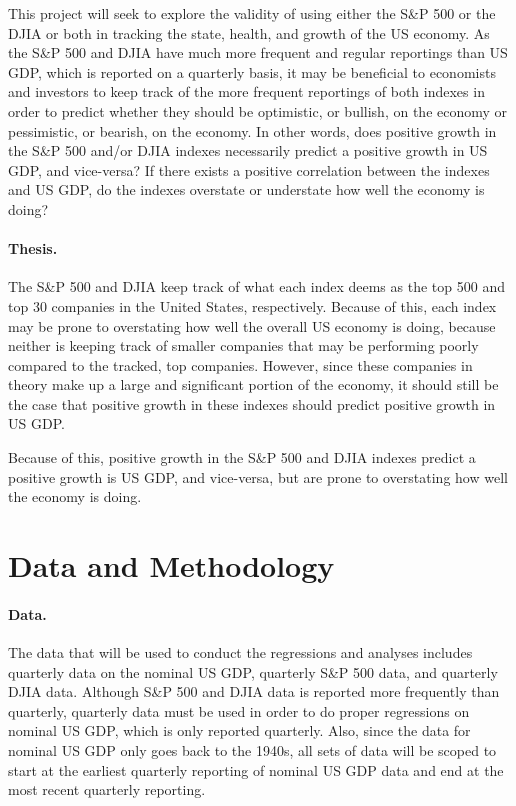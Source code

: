 \documentclass[11pt]{article}
\numberwithin{equation}{section}
\begin{document}
This project will seek to explore the validity of using either the S\&P 500 or the DJIA or both in tracking the state, health, and growth of the US economy. As the S\&P 500 and DJIA have much more frequent and regular reportings than US GDP, which is reported on a quarterly basis, it may be beneficial to economists and investors to keep track of the more frequent reportings of both indexes in order to predict whether they should be optimistic, or bullish, on the economy or pessimistic, or bearish, on the economy. In other words, does positive growth in the S\&P 500 and/or DJIA indexes necessarily predict a positive growth in US GDP, and vice-versa? If there exists a positive correlation between the indexes and US GDP, do the indexes overstate or understate how well the economy is doing?

\paragraph{Thesis.}
The S\&P 500 and DJIA keep track of what each index deems as the top 500 and top 30 companies in the United States, respectively. Because of this, each index may be prone to overstating how well the overall US economy is doing, because neither is keeping track of smaller companies that may be performing poorly compared to the tracked, top companies. However, since these companies in theory make up a large and significant portion of the economy, it should still be the case that positive growth in these indexes should predict positive growth in US GDP.

Because of this, positive growth in the S\&P 500 and DJIA indexes predict a positive growth is US GDP, and vice-versa, but are prone to overstating how well the economy is doing.

\section{Data and Methodology}

\paragraph{Data.} 
The data that will be used to conduct the regressions and analyses includes quarterly data on the nominal US GDP, quarterly S\&P 500 data, and quarterly DJIA data. Although S\&P 500 and DJIA data is reported more frequently than quarterly, quarterly data must be used in order to do proper regressions on nominal US GDP, which is only reported quarterly. Also, since the data for nominal US GDP only goes back to the 1940s, all sets of data will be scoped to start at the earliest quarterly reporting of nominal US GDP data and end at the most recent quarterly reporting.
\end{document}
